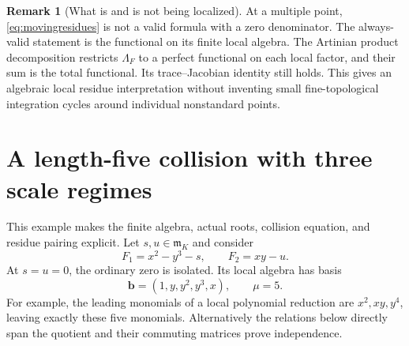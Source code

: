 \documentclass[11pt]{article}
\theoremstyle{definition}
\newtheorem{remark}[theorem]{Remark}
\newcommand{\mm}{\mathfrak m}
\newcommand{\bvec}{\boldsymbol b}
\begin{document}
\begin{remark}[What is and is not being localized]
At a multiple point, \eqref{eq:movingresidues} is not a valid formula with a zero denominator. The always-valid statement is the functional on its finite local algebra. The Artinian product decomposition restricts $\Lambda_F$ to a perfect functional on each local factor, and their sum is the total functional. Its trace--Jacobian identity still holds. This gives an algebraic local residue interpretation without inventing small fine-topological integration cycles around individual nonstandard points.
\end{remark}

\section{A length-five collision with three scale regimes}\label{sec:example}
This example makes the finite algebra, actual roots, collision equation, and residue pairing explicit. Let $s,u\in\mm_K$ and consider
\begin{equation}\label{eq:exampleF}
 F_1=x^2-y^3-s,\qquad F_2=xy-u.
\end{equation}
At $s=u=0$, the ordinary zero is isolated. Its local algebra has basis
\begin{equation}\label{eq:examplebasis}
 \bvec=(1,y,y^2,y^3,x),\qquad \mu=5.
\end{equation}
For example, the leading monomials of a local polynomial reduction are $x^2,xy,y^4$, leaving exactly these five monomials. Alternatively the relations below directly span the quotient and their commuting matrices prove independence.
\end{document}
